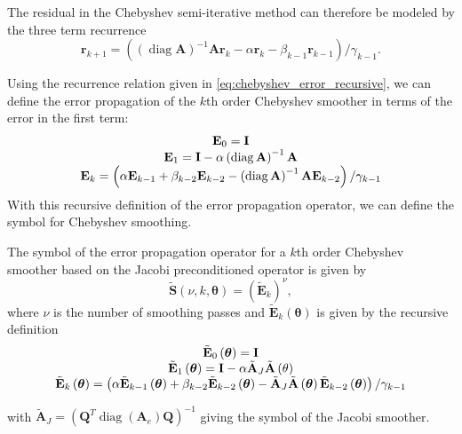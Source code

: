 \documentclass[review]{siamart190516}
\DeclareMathOperator{\diag}{diag}
\begin{document}
The residual in the Chebyshev semi-iterative method can therefore be modeled by the three term recurrence
\begin{equation}
\mathbf{r}_{k + 1} = \left( \left( \diag {\mathbf{A}} \right)^{-1} {\mathbf{A}} \mathbf{r}_k - \alpha \mathbf{r}_k - \beta_{k - 1} \mathbf{r}_{k - 1} \right) / \gamma_{k - 1}.
\label{eq:chebyshev_error_recursive}
\end{equation}

Using the recurrence relation given in \cref{eq:chebyshev_error_recursive}, we can define the error propagation of the $k$th order Chebyshev smoother in terms of the error in the first term:
\begin{equation}
\begin{tabular}{c}
$\mathbf{E}_0 = \mathbf{I}$\\
$\mathbf{E}_1 = \mathbf{I} - \alpha \left( \diag {\mathbf{A}} \right)^{-1} {\mathbf{A}}$\\
$\mathbf{E}_k = \left( \alpha \mathbf{E}_{k - 1} + \beta_{k - 2} \mathbf{E}_{k - 2} - \left( \diag {\mathbf{A}} \right)^{-1} {\mathbf{A}} \mathbf{E}_{k - 2} \right) / \gamma_{k - 1}$
\end{tabular}
\label{eq:chebyshev_error_propagation}
\end{equation}
With this recursive definition of the error propagation operator, we can define the symbol for Chebyshev smoothing.

\begin{definition}
The symbol of the error propagation operator for a $k$th order Chebyshev smoother based on the Jacobi preconditioned operator is given by
\begin{equation}
\tilde{\mathbf{S}} \left( \nu, k, \boldsymbol{\theta} \right) = \left( \tilde{\mathbf{E}}_k \right)^\nu,
\end{equation}
where $\nu$ is the number of smoothing passes and $\tilde{\mathbf{E}}_k \left( \mathbf{\boldsymbol{\theta}} \right)$ is given by the recursive definition
\begin{equation}
\begin{tabular}{c}
$\tilde{\mathbf{E}}_0 \left( \boldsymbol{\theta} \right) = \mathbf{I}$\\
$\tilde{\mathbf{E}}_1 \left( \boldsymbol{\theta} \right) = \mathbf{I} - \alpha \tilde{\mathbf{A}}_J \tilde{\mathbf{A}} \left( \mathbf{\theta} \right)$\\
$\tilde{\mathbf{E}}_k \left( \boldsymbol{\theta} \right) = \left( \alpha \tilde{\mathbf{E}}_{k - 1} \left( \boldsymbol{\theta} \right) + \beta_{k - 2} \tilde{\mathbf{E}}_{k - 2} \left( \boldsymbol{\theta} \right) - \tilde{\mathbf{A}}_J \tilde{\mathbf{A}} \left( \boldsymbol{\theta} \right) \tilde{\mathbf{E}}_{k - 2} \left( \boldsymbol{\theta} \right) \right) / \gamma_{k - 1}$
\end{tabular}
\end{equation}
\label{def:chebyshev_symbol}
\end{definition}
with $\tilde{\mathbf{A}}_J = \left( \mathbf{Q}^T \diag \left( \mathbf{A}_e \right) \mathbf{Q} \right)^{-1}$ giving the symbol of the Jacobi smoother.
\end{document}
